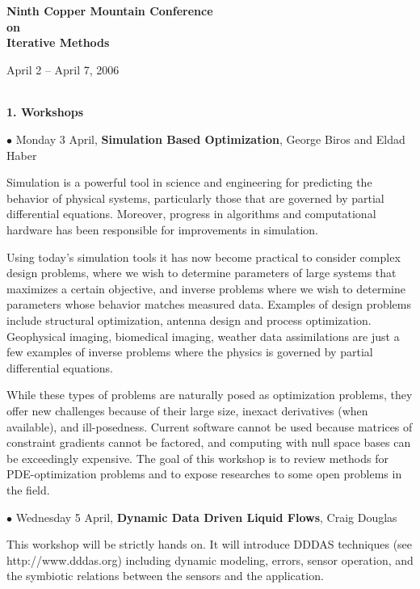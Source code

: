 \documentclass[twosided]{report}
\begin{document}
\begin{center}
	{\Large \bf
	Ninth Copper Mountain Conference \\
	{\large on} \\
	Iterative Methods \par
	April 2 -- April 7, 2006
	}
\end{center}

	${}^{}$\par	%
	\begin{center} {\LARGE {\bf 1. Workshops}} \end{center}

	$\bullet$
	Monday 3 April,
	{\bf Simulation Based Optimization},
	George Biros and Eldad Haber

Simulation is a powerful tool in science and engineering for
predicting the behavior of physical systems, particularly
those that are governed by partial differential equations.
Moreover, progress in algorithms and computational hardware
has been responsible for improvements in simulation.

Using today's simulation tools it has now become practical
to consider complex design problems, where we wish to
determine parameters of large systems that maximizes a
certain objective, and inverse problems where we wish to
determine parameters whose behavior matches measured data.
Examples of design problems include structural optimization,
antenna design and process optimization. Geophysical
imaging, biomedical imaging, weather data assimilations are
just a few examples of inverse problems where the physics is
governed by partial differential equations.

While these types of problems are naturally posed as
optimization problems, they offer new challenges because of
their large size, inexact derivatives (when available), and
ill-posedness. Current software cannot be used because
matrices of constraint gradients cannot be factored, and
computing with null space bases can be exceedingly
expensive. The goal of this workshop is to review methods
for PDE-optimization problems and to expose researches to
some open problems in the field.

	$\bullet$
	Wednesday 5 April,
	{\bf Dynamic Data Driven Liquid Flows},
	Craig Douglas

This workshop will be strictly hands on. It will introduce
DDDAS techniques (see http://www.dddas.org) including
dynamic modeling, errors, sensor operation, and the
symbiotic relations between the sensors and the application.
\end{document}
